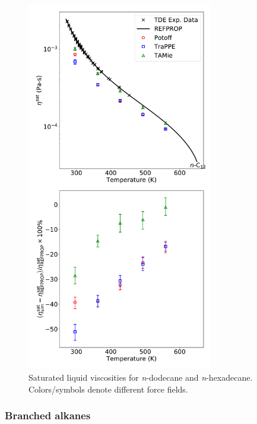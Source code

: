 \documentclass[preprint,review,12pt]{elsarticle}
\begin{document}
	\begin{figure}[p!]
		\centering
		\includegraphics[width=3.2in]{compare_force_fields_C12.pdf}
		\caption{Saturated liquid viscosities for \textit{n}-dodecane and \textit{n}-hexadecane. Colors/symbols denote different force fields.}
		\label{fig:Saturation_C12_C16}
	\end{figure} 
	
	\subsubsection{Branched alkanes}
	
	
	
\end{document}
